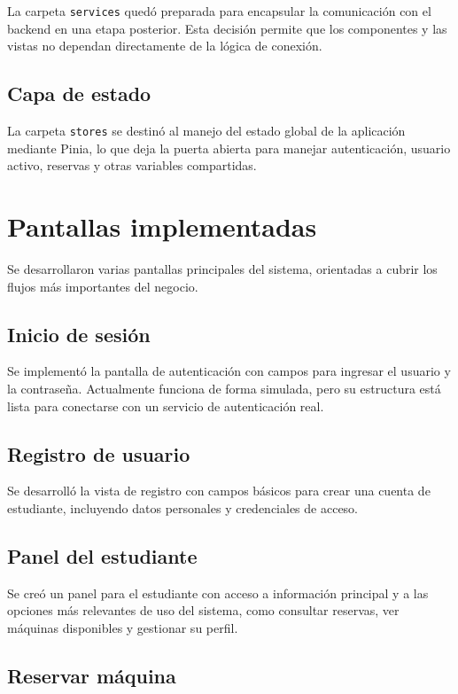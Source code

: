 \documentclass[12pt]{article}
\begin{document}
La carpeta \texttt{services} quedó preparada para encapsular la comunicación con el backend en una etapa posterior. Esta decisión permite que los componentes y las vistas no dependan directamente de la lógica de conexión.

\subsection{Capa de estado}

La carpeta \texttt{stores} se destinó al manejo del estado global de la aplicación mediante Pinia, lo que deja la puerta abierta para manejar autenticación, usuario activo, reservas y otras variables compartidas.

\section{Pantallas implementadas}

Se desarrollaron varias pantallas principales del sistema, orientadas a cubrir los flujos más importantes del negocio.

\subsection{Inicio de sesión}

Se implementó la pantalla de autenticación con campos para ingresar el usuario y la contraseña. Actualmente funciona de forma simulada, pero su estructura está lista para conectarse con un servicio de autenticación real.

\subsection{Registro de usuario}

Se desarrolló la vista de registro con campos básicos para crear una cuenta de estudiante, incluyendo datos personales y credenciales de acceso.

\subsection{Panel del estudiante}

Se creó un panel para el estudiante con acceso a información principal y a las opciones más relevantes de uso del sistema, como consultar reservas, ver máquinas disponibles y gestionar su perfil.

\subsection{Reservar máquina}
\end{document}
